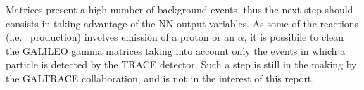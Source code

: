 \bigbreak
\bigbreak
\bigbreak
\bigbreak

Matrices present a high number of background events, thus the next step should
consists in taking advantage of the NN output variables. As some of the
reactions (i.e.\  production) involves emission of a proton or an
$\alpha$, it is possibile to clean the GALILEO gamma matrices taking into
account only the events in which a particle is detected by the TRACE detector.
Such a step is still in the making by the GALTRACE collaboration, and is not
in the interest of this report.
